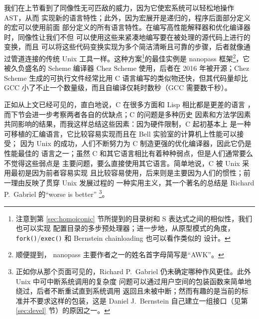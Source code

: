 我们在上节看到了同像性无可匹敌的威力，因为它使宏系统可以轻松地操作 AST，从而
实现新的语言特性；此外，因为宏展开是递归的，程序后面部分定义的宏可以使用前面
部分定义的所有语言特性。在编写高性能解释器和优化编译器时，同像性让我们不但
可以使用这些来紧凑地编写要在被处理的源代码上进行的变换，而且
可以将这些代码变换实现为多个简洁清晰且可靠的步骤，后者就像通过管道连接的传统
Unix 工具一样。这种方案\footnote{\label{fn:slew}注意到第
\ref{sec:homoiconic} 节所提到的目录树和 S 表达式之间的相似性，我们也可以实现
配置目录的多步预处理器；进一步地，从原型模式的角度，%
\texttt{fork()}/\texttt{exec()} 和 Bernstein chainloading 也可以看作类似的
设计。}的最佳实例是 nanopass 框架\footnote{顺便提到，%
nanopass 主要作者之一的姓名首字母简写是“AWK”。}，它被久负盛名的 Scheme 编译器
Chez Scheme 使用，后者在 2016 年被开源；Chez Scheme
生成的可执行文件经常比用 C 语言编写的类似物还快，但其代码量却比
GCC 小了不止一个数量级，而且自编译仅耗时数秒（GCC 需要数千秒）。

正如从上文已经可见的，直白地说，C 在很多方面和 Lisp 相比都是更差的语言%
，而下节会进一步考察两者各自的优缺点；C 的问题是多种历史
因素和方法学因素共同影响的结果，而我这样总结这些因素：因为硬件限制，C 起初基本上
是一种可移植的汇编语言，它比较容易实现而且在 Bell 实验室的计算机上性能可以接受；
因为 Unix 的成功，人们不断努力为 C 制造更强的优化编译器，因此它仍是性能最佳的
语言之一；虽然 C 和其它语言相比有着种种弱点，但是人们通常要么不觉得这些弱点是
主要问题，要么直接使用其它语言。简单地说，C 被 Unix 采用最初是因为前者容易实现
且比较容易使用，后来则是主要因为人们的惯性；前一理由反映了贯穿 Unix 发展过程的
一种实用主义，其一个著名的总结是 Richard P.\ Gabriel 的“worse is better”%
\footnote{正如你从那个页面可见的，Richard
P.\ Gabriel 仍未确定哪种作风更佳。此外 Unix 中可中断系统调用的复杂度
问题可以通过用户空间的包装函数来简单地绕过，后者不断重试直到系统调用
返回且未被中断；然而有趣的是当前的标准并不要求这样的包装，这是 Daniel
J.\ Bernstein 自己建立一组接口（见第 \ref{sec:devel} 节）的原因之一。}。

